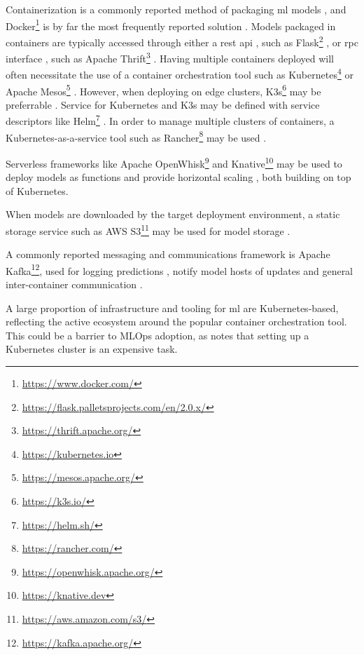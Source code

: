 Containerization is a commonly reported method of packaging \acrshort{ml} models \cite{Ruf2021, Peticolas2019, Rausch2019}, and Docker\footnote{\url{https://www.docker.com/}} is by far the most frequently reported solution \cite{Krishnamurthi2019, Richins2020, Li2017,Garcia2020,Crankshaw2017, Paeaekkoenen2020,Gupta2020}.
Models packaged in containers are typically accessed through either a \acrshort{rest} \acrshort{api} \cite{Garcia2020, Paeaekkoenen2020}, such as Flask\footnote{\url{https://flask.palletsprojects.com/en/2.0.x/}} \cite{Gupta2020}, or \acrshort{rpc} interface \cite{Ruf2021, Crankshaw2017}, such as Apache Thrift\footnote{\url{https://thrift.apache.org/}} \cite{Li2017}.
Having multiple containers deployed will often necessitate the use of a container orchestration tool such as Kubernetes\footnote{\url{https://kubernetes.io}} \cite{Liu2020, Richins2020, Paeaekkoenen2020, Rausch2019a} or Apache Mesos\footnote{\url{https://mesos.apache.org/}} \cite{Garcia2020}.
However, when deploying on edge clusters, K3s\footnote{\url{https://k3s.io/}} may be preferrable \cite{Paeaekkoenen2020}.
Service for Kubernetes and K3s may be defined with service descriptors like Helm\footnote{\url{https://helm.sh/}} \cite{Paeaekkoenen2020}.
In order to manage multiple clusters of containers, a Kubernetes-as-a-service tool such as Rancher\footnote{\url{https://rancher.com/}} may be used \cite{Paeaekkoenen2020}.

Serverless frameworks like Apache OpenWhisk\footnote{\url{https://openwhisk.apache.org/}} and Knative\footnote{\url{https://knative.dev}} may be used to deploy models as functions and provide horizontal scaling \cite{Rausch2019a, Garcia2020}, both building on top of Kubernetes.

When models are downloaded by the target deployment environment, a static storage service such as AWS S3\footnote{\url{https://aws.amazon.com/s3/}} may be used for model storage \cite{Liu2020, Chahal2020}.

A commonly reported messaging and communications framework is Apache Kafka\footnote{\url{https://kafka.apache.org/}}, used for logging predictions \cite{Li2017}, notify model hosts of updates \cite{Liu2020,Garcia2020} and general inter-container communication \cite{Richins2020}.

A large proportion of infrastructure and tooling for \acrshort{ml} are Kubernetes-based, reflecting the active ecosystem around the popular container orchestration tool.
This could be a barrier to MLOps adoption, as \textcite{Ruf2021} notes that setting up a Kubernetes cluster is an expensive task.

